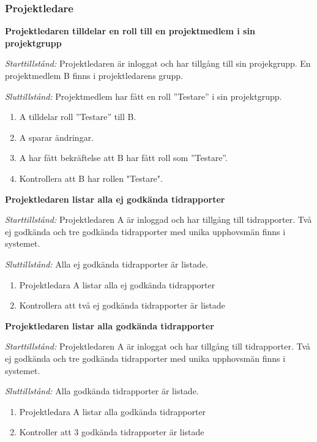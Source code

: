 \documentclass[a4paper]{article}
\begin{document}
\subsubsection{Projektledare}
\begin{FT}

\item %
\textbf{Projektledaren tilldelar en roll till en projektmedlem i sin projektgrupp}

\emph{Starttillstånd:} Projektledaren är inloggat och har tillgång till sin projekgrupp. En projektmedlem B finns i projektledarens grupp.

\emph{Sluttillstånd:} Projektmedlem har fått en roll ”Testare” i sin projektgrupp.

\begin{enumerate}
\item A tilldelar roll ”Testare” till B.
\item A sparar ändringar.
\item A har fått bekräftelse att B har fått roll som ”Testare”.
\item Kontrollera att B har rollen "Testare".
\end{enumerate}

\item %
\textbf{Projektledaren listar alla ej godkända tidrapporter}

\emph{Starttillstånd:} Projektledaren A är inloggad och har tillgång till tidrapporter. Två ej godkända och tre godkända tidrapporter med unika upphovsmän finns i systemet.

\emph{Sluttillstånd:} Alla ej godkända tidrapporter är listade.                          

\begin{enumerate}
\item Projektledara A listar alla ej godkända tidrapporter
\item Kontrollera att två ej godkända tidrapporter är listade
\end{enumerate}

\item %
\textbf{Projektledaren listar alla godkända tidrapporter}

\emph{Starttillstånd:} Projektledaren A är inloggat och har tillgång till tidrapporter. Två ej godkända och tre godkända tidrapporter med unika upphovsmän finns i systemet.

\emph{Sluttillstånd:} Alla godkända tidrapporter är listade.

\begin{enumerate}
\item Projektledara A listar alla godkända tidrapporter
\item Kontroller att 3 godkända tidrapporter är listade
\end{enumerate}


\end{FT}
\end{document}
